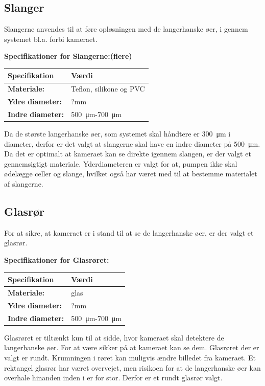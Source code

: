 \subsection{Slanger}
Slangerne anvendes til at føre opløsningen med de langerhanske øer, i gennem systemet bl.a. forbi kameraet.

\textbf{Specifikationer for Slangerne:(flere)} 
\begin{center}
		\begin{longtable}{ | m{6.5cm} | m{6.5cm}| } 
			\hline
			\textbf{Specifikation} &\textbf{Værdi} \\ 
			\hline
			\textbf{Materiale:} & Teflon, silikone og PVC \\ 
			\hline
			\textbf{Ydre diameter:} & ?mm  \\ 
			\hline
			\textbf{Indre diameter:} & \SI{500}{\micro\metre}-\SI{700}{\micro\metre}  \\ 
			\hline			
		\end{longtable}
\end{center}

Da de største langerhanske øer, som systemet skal håndtere er \SI{300}{\micro\metre} i diameter, derfor er det valgt at slangerne skal have en indre diameter på \SI{500}{\micro\metre}. Da det er optimalt at kameraet kan se direkte igennem slangen, er der valgt et gennemsigtigt materiale. Yderdiameteren er valgt for at, pumpen ikke skal ødelægge celler og slange, hvilket også har været med til at bestemme materialet af slangerne. 

\subsection{Glasrør}
For at sikre, at kameraet er i stand til at se de langerhanske øer, er der valgt et glasrør.

\textbf{Specifikationer for Glasrøret:} 

\begin{center}
		\begin{longtable}{ | m{6.5cm} | m{6.5cm}| } 
			\hline
			\textbf{Specifikation} &\textbf{Værdi} \\ 
			\hline
			\textbf{Materiale:} & glas \\ 
			\hline
			\textbf{Ydre diameter:} & ?mm  \\ 
			\hline
			\textbf{Indre diameter:} & \SI{500}{\micro\metre}-\SI{700}{\micro\metre}  \\ 
			\hline			
		\end{longtable}
\end{center}

Glasrøret er tiltænkt kun til at sidde, hvor kameraet skal detektere de langerhanske øer. For at være sikker på at kameraet kan se dem. Glasrøret der er valgt er rundt. Krumningen i røret kan muligvis ændre billedet fra kameraet. Et rektangel glasrør har været overvejet, men risikoen for at de langerhanske øer kan overhale hinanden inden i er for stor. Derfor er et rundt glasrør valgt.





